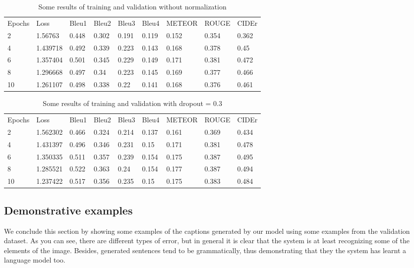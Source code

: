 \begin{table}[hbt]
\caption{Some results of training and validation without normalization}
\label{tab:without-dropout}
\begin{tabular}{lllllllll}
Epochs & Loss & Bleu1 & Bleu2 & Bleu3 & Bleu4 & METEOR & ROUGE & CIDEr \\
2 & 1.56763 & 0.448 & 0.302 & 0.191 & 0.119 & 0.152 & 0.354 & 0.362 \\
4 & 1.439718 & 0.492 & 0.339 & 0.223 & 0.143 & 0.168 & 0.378 & 0.45 \\
6 & 1.357404 & 0.501 & 0.345 & 0.229 & 0.149 & 0.171 & 0.381 & 0.472 \\
8 & 1.296668 & 0.497 & 0.34 & 0.223 & 0.145 & 0.169 & 0.377 & 0.466 \\
10 & 1.261107 & 0.498 & 0.338 & 0.22 & 0.141 & 0.168 & 0.376 & 0.461
\end{tabular}
\end{table}

\begin{table}[hbt]
\caption{Some results of training and validation with dropout = 0.3}
\label{tab:with-dropout}
\begin{tabular}{lllllllll}
Epochs & Loss & Bleu1 & Bleu2 & Bleu3 & Bleu4 & METEOR & ROUGE & CIDEr \\
2 & 1.562302 & 0.466 & 0.324 & 0.214 & 0.137 & 0.161 & 0.369 & 0.434 \\
4 & 1.431397 & 0.496 & 0.346 & 0.231 & 0.15 & 0.171 & 0.381 & 0.478 \\
6 & 1.350335 & 0.511 & 0.357 & 0.239 & 0.154 & 0.175 & 0.387 & 0.495 \\
8 & 1.285521 & 0.522 & 0.363 & 0.24 & 0.154 & 0.177 & 0.387 & 0.494 \\
10 & 1.237422 & 0.517 & 0.356 & 0.235 & 0.15 & 0.175 & 0.383 & 0.484 \\
\end{tabular}
\end{table}

\subsection{Demonstrative examples}

We conclude this section by showing some examples of the captions generated by our model using some examples from the validation dataset. As you can see, there are different types of error, but in general it is clear that the system is at least recognizing some of the elements of the image. Besides, generated sentences tend to be grammatically, thus demonstrating that they the system has learnt a language model too.

